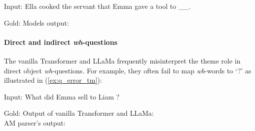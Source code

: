 \begin{exe}
    \ex \label{ex:RC_iobj_extracted} Input: Ella cooked the servant that Emma gave a tool to \_\_.
    \begin{xlist}
    \ex \label{ex:RC_iobj_extracted_gold} Gold: 
    \ex \label{ex:RC_iobj_extracted_error} Models output:  
    \end{xlist}
\end{exe}

\paragraph{Direct and indirect \textit{wh}-questions}The vanilla Transformer and LLaMa frequently misinterpret the theme role in direct object \emph{wh}-questions. For example, they often fail to map \emph{wh}-words to `?' as illustrated in (\ref{ex:q_error_tm}):  
\begin{exe}

\ex \label{ex:q_input}Input: What did Emma sell to Liam ?
\small{\begin{xlist}
    \ex \label{ex:q_gold} Gold:
    \ex \label{ex:q_error_tm} Output of vanilla Transformer and LLaMa: \\ 
    \ex \label{ex:q_error_am} AM parser's output: \\ 
\end{xlist}}
\end{exe}

